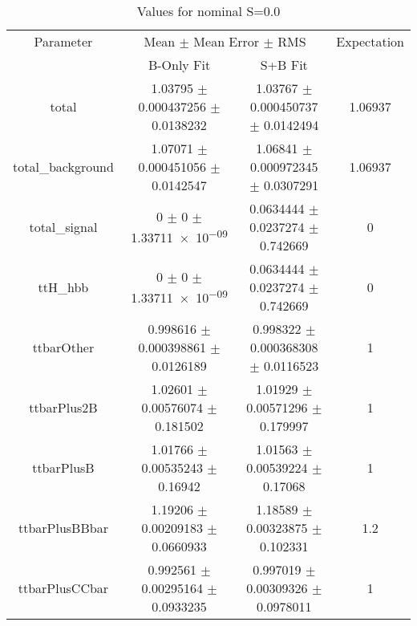 \begin{table}
\centering
\caption{Values for nominal S=0.0}
\begin{tabular}{cccc}
\toprule
Parameter & \multicolumn{2}{c}{Mean $\pm$ Mean Error $\pm$ RMS} & Expectation\\
 & B-Only Fit & S+B Fit & \\
\midrule
total & \num{1.03795} $\pm$ \num{0.000437256} $\pm$ \num{0.0138232} & \num{1.03767} $\pm$ \num{0.000450737} $\pm$ \num{0.0142494} & \num{1.06937}\\
total\_background & \num{1.07071} $\pm$ \num{0.000451056} $\pm$ \num{0.0142547} & \num{1.06841} $\pm$ \num{0.000972345} $\pm$ \num{0.0307291} & \num{1.06937}\\
total\_signal & \num{0} $\pm$ \num{0} $\pm$ \num{1.33711e-09} & \num{0.0634444} $\pm$ \num{0.0237274} $\pm$ \num{0.742669} & \num{0}\\
ttH\_hbb & \num{0} $\pm$ \num{0} $\pm$ \num{1.33711e-09} & \num{0.0634444} $\pm$ \num{0.0237274} $\pm$ \num{0.742669} & \num{0}\\
ttbarOther & \num{0.998616} $\pm$ \num{0.000398861} $\pm$ \num{0.0126189} & \num{0.998322} $\pm$ \num{0.000368308} $\pm$ \num{0.0116523} & \num{1}\\
ttbarPlus2B & \num{1.02601} $\pm$ \num{0.00576074} $\pm$ \num{0.181502} & \num{1.01929} $\pm$ \num{0.00571296} $\pm$ \num{0.179997} & \num{1}\\
ttbarPlusB & \num{1.01766} $\pm$ \num{0.00535243} $\pm$ \num{0.16942} & \num{1.01563} $\pm$ \num{0.00539224} $\pm$ \num{0.17068} & \num{1}\\
ttbarPlusBBbar & \num{1.19206} $\pm$ \num{0.00209183} $\pm$ \num{0.0660933} & \num{1.18589} $\pm$ \num{0.00323875} $\pm$ \num{0.102331} & \num{1.2}\\
ttbarPlusCCbar & \num{0.992561} $\pm$ \num{0.00295164} $\pm$ \num{0.0933235} & \num{0.997019} $\pm$ \num{0.00309326} $\pm$ \num{0.0978011} & \num{1}\\
\bottomrule
\end{tabular}
\end{table}